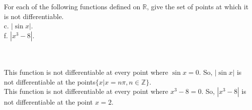 For each of the following functions defined on $\mathbb{R}$, give the set of points at which it is not
differentiable.\\

c. $|\sin x|$.\\

f. $|x^3-8|$.\\\\

\begin{solution}\renewcommand{\qedsymbol}{}\ \\
    This function is not differentiable at every point where $\sin x=0$. So, $|\sin x|$ is not
    differentiable at the points$\{x|x=n\pi,n\in\mathbb{Z}\}$.\\

    This function is not differentiable at every point where $x^3-8=0$. So, $|x^3-8|$ is not
    differentiable at the point $x=2$.

\end{solution}